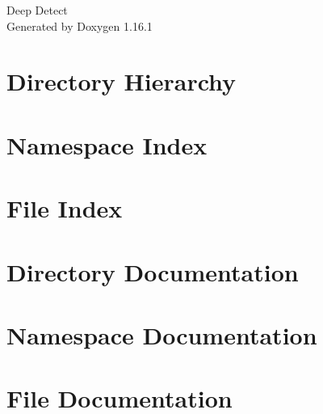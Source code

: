 \documentclass[twoside]{book}
\newcommand{\+}{\discretionary{\mbox{\scriptsize$\hookleftarrow$}}{}{}}
\newcommand{\clearemptydoublepage}{%
    \newpage{\pagestyle{empty}\cleardoublepage}%
  }
\begin{document}
  \raggedbottom
    \hypersetup{pageanchor=false,
                bookmarksnumbered=true,
                pdfencoding=unicode
               }
  \begin{titlepage}
  \vspace*{7cm}
  \begin{center}%
  {\Large Deep Detect}\\
  \vspace*{1cm}
  {\large Generated by Doxygen 1.16.1}\\
  \end{center}
  \end{titlepage}
  \clearemptydoublepage
  \tableofcontents
  \clearemptydoublepage
  \hypersetup{pageanchor=true}
\chapter{Directory Hierarchy}

\chapter{Namespace Index}

\chapter{File Index}

\chapter{Directory Documentation}


\chapter{Namespace Documentation}












\chapter{File Documentation}













  \backmatter
  \newpage
  \clearemptydoublepage
  \printindex
\end{document}
